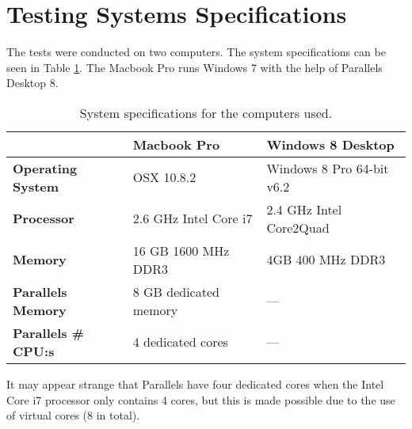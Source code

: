 \section{Testing Systems Specifications} \label{sec:system_specs}
The tests were conducted on two computers. The system specifications can be seen in Table \ref{table:system_specs}. The Macbook Pro runs Windows 7 with the help of Parallels Desktop 8. 

\begin{table}[h]
	\begin{center}
		\begin{tabular} { m{4cm} | m{4cm}  | m{5cm} }
			\hline
			\textbf{} & \textbf{Macbook Pro} & 
			\textbf{Windows 8 Desktop}  \\ \hline

			\textbf{Operating System}		& OSX 10.8.2 
											& Windows 8 Pro 64-bit v6.2 \\ \hline

			\textbf{Processor}				& 2.6 GHz Intel Core i7 
											& 2.4 GHz Intel Core2Quad  \\ \hline

			\textbf{Memory}					& 16 GB 1600 MHz DDR3
											& 4GB 400 MHz DDR3 \\ \hline

			\textbf{Parallels Memory}		& 8 GB dedicated memory 
											& --- \\ \hline

			\textbf{Parallels \# CPU:s} 	& 4 dedicated cores
											& --- \\ \hline
		\end{tabular}
	\end{center}
	\caption{System specifications for the computers used.}
	\label{table:system_specs}
\end{table}
It may appear strange that Parallels have four dedicated cores when the Intel Core i7 processor only contains 4 cores, but this is made possible due to the use of virtual cores (8 in total).



